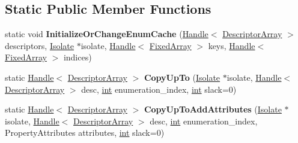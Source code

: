 \subsection*{Static Public Member Functions}
\begin{DoxyCompactItemize}
\item 
\mbox{\label{classv8_1_1internal_1_1DescriptorArray_a07cd67b18cf940481c71ccea7ac0d429}} 
static void {\bfseries Initialize\+Or\+Change\+Enum\+Cache} (\mbox{\hyperlink{classv8_1_1internal_1_1Handle}{Handle}}$<$ \mbox{\hyperlink{classv8_1_1internal_1_1DescriptorArray}{Descriptor\+Array}} $>$ descriptors, \mbox{\hyperlink{classv8_1_1internal_1_1Isolate}{Isolate}} $\ast$isolate, \mbox{\hyperlink{classv8_1_1internal_1_1Handle}{Handle}}$<$ \mbox{\hyperlink{classv8_1_1internal_1_1FixedArray}{Fixed\+Array}} $>$ keys, \mbox{\hyperlink{classv8_1_1internal_1_1Handle}{Handle}}$<$ \mbox{\hyperlink{classv8_1_1internal_1_1FixedArray}{Fixed\+Array}} $>$ indices)
\item 
\mbox{\label{classv8_1_1internal_1_1DescriptorArray_a28b34f8e13498f5f9de04327b8576ed6}} 
static \mbox{\hyperlink{classv8_1_1internal_1_1Handle}{Handle}}$<$ \mbox{\hyperlink{classv8_1_1internal_1_1DescriptorArray}{Descriptor\+Array}} $>$ {\bfseries Copy\+Up\+To} (\mbox{\hyperlink{classv8_1_1internal_1_1Isolate}{Isolate}} $\ast$isolate, \mbox{\hyperlink{classv8_1_1internal_1_1Handle}{Handle}}$<$ \mbox{\hyperlink{classv8_1_1internal_1_1DescriptorArray}{Descriptor\+Array}} $>$ desc, \mbox{\hyperlink{classint}{int}} enumeration\+\_\+index, \mbox{\hyperlink{classint}{int}} slack=0)
\item 
\mbox{\label{classv8_1_1internal_1_1DescriptorArray_a5216d4e35cdbba7f6f1d9fe66d050ee2}} 
static \mbox{\hyperlink{classv8_1_1internal_1_1Handle}{Handle}}$<$ \mbox{\hyperlink{classv8_1_1internal_1_1DescriptorArray}{Descriptor\+Array}} $>$ {\bfseries Copy\+Up\+To\+Add\+Attributes} (\mbox{\hyperlink{classv8_1_1internal_1_1Isolate}{Isolate}} $\ast$isolate, \mbox{\hyperlink{classv8_1_1internal_1_1Handle}{Handle}}$<$ \mbox{\hyperlink{classv8_1_1internal_1_1DescriptorArray}{Descriptor\+Array}} $>$ desc, \mbox{\hyperlink{classint}{int}} enumeration\+\_\+index, Property\+Attributes attributes, \mbox{\hyperlink{classint}{int}} slack=0)
\item 
\mbox{\label{classv8_1_1internal_1_1DescriptorArray_a7c2867ed79e62433665943d0d1dec350}} 

\end{DoxyCompactItemize}
